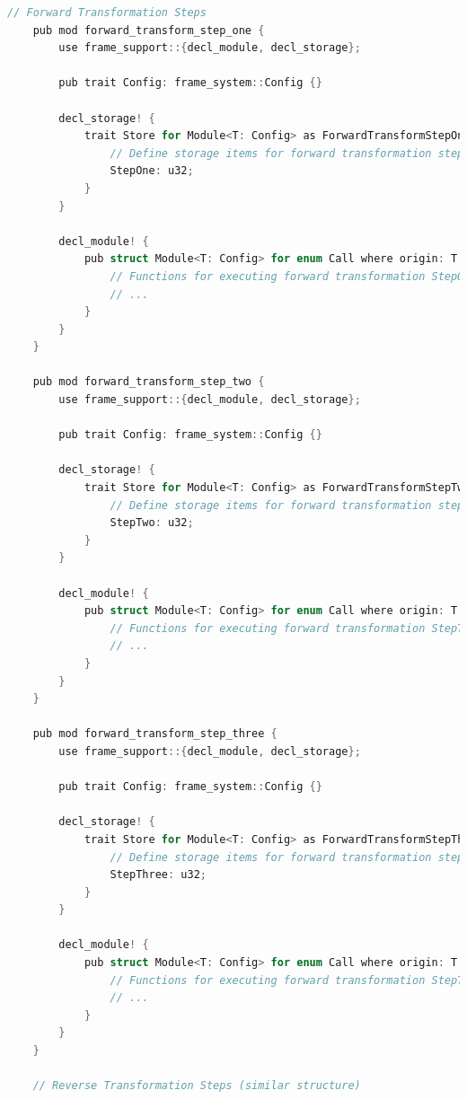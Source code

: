 \documentclass{tufte-handout}
\begin{document}
\begin{lstlisting}[language=C, caption=State Machine]
    // Forward Transformation Steps
    pub mod forward_transform_step_one {
        use frame_support::{decl_module, decl_storage};
    
        pub trait Config: frame_system::Config {}
    
        decl_storage! {
            trait Store for Module<T: Config> as ForwardTransformStepOne {
                // Define storage items for forward transformation step one
                StepOne: u32;
            }
        }
    
        decl_module! {
            pub struct Module<T: Config> for enum Call where origin: T::Origin {
                // Functions for executing forward transformation StepOne
                // ...
            }
        }
    }
    
    pub mod forward_transform_step_two {
        use frame_support::{decl_module, decl_storage};
    
        pub trait Config: frame_system::Config {}
    
        decl_storage! {
            trait Store for Module<T: Config> as ForwardTransformStepTwo {
                // Define storage items for forward transformation step two
                StepTwo: u32;
            }
        }
    
        decl_module! {
            pub struct Module<T: Config> for enum Call where origin: T::Origin {
                // Functions for executing forward transformation StepTwo
                // ...
            }
        }
    }
    
    pub mod forward_transform_step_three {
        use frame_support::{decl_module, decl_storage};
    
        pub trait Config: frame_system::Config {}
    
        decl_storage! {
            trait Store for Module<T: Config> as ForwardTransformStepThree {
                // Define storage items for forward transformation step three
                StepThree: u32;
            }
        }
    
        decl_module! {
            pub struct Module<T: Config> for enum Call where origin: T::Origin {
                // Functions for executing forward transformation StepThree
                // ...
            }
        }
    }
    
    // Reverse Transformation Steps (similar structure)
    

\end{lstlisting}
\end{document}
